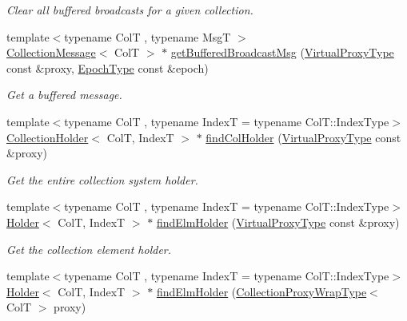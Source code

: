 \begin{DoxyCompactItemize}
\begin{DoxyCompactList}\small\item\em Clear all buffered broadcasts for a given collection. \end{DoxyCompactList}\item 
{\footnotesize template$<$typename ColT , typename MsgT $>$ }\\\hyperlink{structvt_1_1vrt_1_1collection_1_1_collection_message}{Collection\+Message}$<$ ColT $>$ $\ast$ \hyperlink{structvt_1_1vrt_1_1collection_1_1_collection_manager_a8c992f2c417d5d44b8b8a603d21920de}{get\+Buffered\+Broadcast\+Msg} (\hyperlink{namespacevt_a1b417dd5d684f045bb58a0ede70045ac}{Virtual\+Proxy\+Type} const \&proxy, \hyperlink{namespacevt_a985a5adf291c34a3ca263b3378388236}{Epoch\+Type} const \&epoch)
\begin{DoxyCompactList}\small\item\em Get a buffered message. \end{DoxyCompactList}\item 
{\footnotesize template$<$typename ColT , typename IndexT  = typename Col\+T\+::\+Index\+Type$>$ }\\\hyperlink{structvt_1_1vrt_1_1collection_1_1_collection_holder}{Collection\+Holder}$<$ ColT, IndexT $>$ $\ast$ \hyperlink{structvt_1_1vrt_1_1collection_1_1_collection_manager_ac3fe0114969d91628d612eccc2166159}{find\+Col\+Holder} (\hyperlink{namespacevt_a1b417dd5d684f045bb58a0ede70045ac}{Virtual\+Proxy\+Type} const \&proxy)
\begin{DoxyCompactList}\small\item\em Get the entire collection system holder. \end{DoxyCompactList}\item 
{\footnotesize template$<$typename ColT , typename IndexT  = typename Col\+T\+::\+Index\+Type$>$ }\\\hyperlink{structvt_1_1vrt_1_1collection_1_1_holder}{Holder}$<$ ColT, IndexT $>$ $\ast$ \hyperlink{structvt_1_1vrt_1_1collection_1_1_collection_manager_a06ff4b51fe7e15c8c4b7768cf7a1ad03}{find\+Elm\+Holder} (\hyperlink{namespacevt_a1b417dd5d684f045bb58a0ede70045ac}{Virtual\+Proxy\+Type} const \&proxy)
\begin{DoxyCompactList}\small\item\em Get the collection element holder. \end{DoxyCompactList}\item 
{\footnotesize template$<$typename ColT , typename IndexT  = typename Col\+T\+::\+Index\+Type$>$ }\\\hyperlink{structvt_1_1vrt_1_1collection_1_1_holder}{Holder}$<$ ColT, IndexT $>$ $\ast$ \hyperlink{structvt_1_1vrt_1_1collection_1_1_collection_manager_aa7f2e2fbbd73a3d7111904c0b31807e6}{find\+Elm\+Holder} (\hyperlink{structvt_1_1vrt_1_1collection_1_1_collection_manager_a56458ed7f9bb22b631b9b3a745f42f94}{Collection\+Proxy\+Wrap\+Type}$<$ ColT $>$ proxy)

\end{DoxyCompactItemize}
